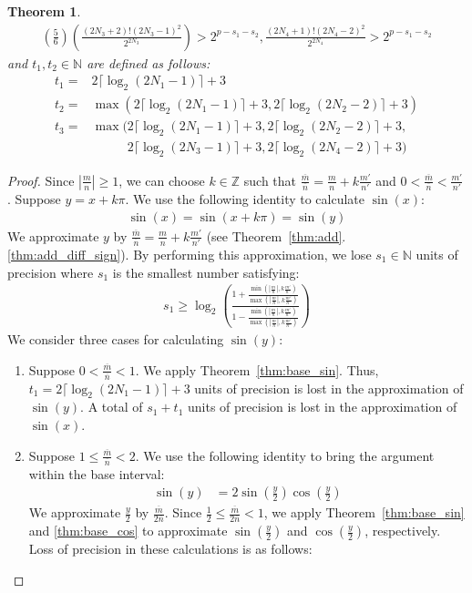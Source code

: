 \documentclass{article}
\newcommand{\nat}{\mathbb{N}}
\newcommand{\integer}{\mathbb{Z}}
\newcommand{\om}{\overline{m}}
\newcommand{\on}{\overline{n}}
\newtheorem{mytheorem}{Theorem}
\numberwithin{mytheorem}{section}
\begin{document}
\begin{mytheorem}
\begin{gather*}
(\frac{5}{6})(\frac{(2N_3+2)!(2N_3-1)^2}{2^{2N_3}})>2^{p-s_1-s_2},\frac{(2N_4+1)!(2N_4-2)^2}{2^{2N_4}}>2^{p-s_1-s_2}
\end{gather*}
and $t_1,t_2\in \nat$ are defined as follows:
\begin{align*}
t_1=&2\lceil\log_2(2N_1-1) \rceil+3\\
t_2=&\max(2\lceil\log_2(2N_1-1) \rceil+3,2\lceil\log_2(2N_2-2) \rceil+3)\\
t_3=&\max(2\lceil\log_2(2N_1-1) \rceil+3,2\lceil\log_2(2N_2-2) \rceil+3,\\
&\phantom{\max(} 2\lceil\log_2(2N_3-1) \rceil+3,2\lceil\log_2(2N_4-2) \rceil+3)
\end{align*}

\end{mytheorem}

\begin{proof}
Since $|\frac{m}{n}|\geq 1$, we can choose $k\in \integer$ such that $\frac{\om}{\on}=\frac{m}{n}+k\frac{m'}{n'}$ and $0< \frac{\om}{\on}<\frac{m'}{n'}$. Suppose $y=x+k\pi$. We use the following identity to calculate $\sin(x)$:
\begin{align}
\sin(x)=\sin(x+k\pi)=\sin(y)\label{eqn:red_sin}
\end{align}
We approximate $y$ by $\frac{\om}{\on}=\frac{m}{n}+k\frac{m'}{n'}$ (see Theorem~\ref{thm:add}.\ref{thm:add_diff_sign}). By performing this approximation, we lose $s_1\in\nat$ units of precision where $s_1$ is the smallest number satisfying:
\begin{align*}
s_1\geq \log_2(\frac{1+\frac{\min(|\frac{m}{n}|,k\frac{m'}{n'})}{\max(|\frac{m}{n}|,k\frac{m'}{n'})}}{1-\frac{\min(|\frac{m}{n}|,k\frac{m'}{n'})}{\max(|\frac{m}{n}|,k\frac{m'}{n'})}})
\end{align*}
We consider three cases for calculating $\sin(y)$:
\begin{enumerate}
\item
Suppose $0<\frac{\om}{\on}<1$. We apply Theorem~\ref{thm:base_sin}. Thus, $t_1=2\lceil\log_2(2N_1-1) \rceil+3$ units of precision is lost in the approximation of $\sin(y)$. A total of $s_1+t_1$ units of precision is lost in the approximation of $\sin(x)$.
\item
Suppose $1\leq \frac{\om}{\on}<2$. We use the following identity to bring the argument within the base interval:
\begin{align}
\sin(y)&=2\sin(\frac{y}{2})\cos(\frac{y}{2})\label{eqn:sin_id1}
\end{align}
We approximate $\frac{y}{2}$ by $\frac{\om}{2\on}$. Since $\frac{1}{2}\leq \frac{\om}{2\on}<1$, we apply Theorem~\ref{thm:base_sin} and \ref{thm:base_cos} to approximate $\sin(\frac{y}{2})$ and $\cos(\frac{y}{2})$, respectively. Loss of precision in these calculations is as follows:

\end{enumerate}
\end{proof}
\end{document}
